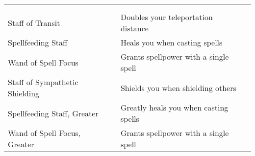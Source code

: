 
\begin{longtabuwrapper}
\begin{longtabu}{l l X l}
 \\
 &  &  &  \\
\bottomrule
Staff of Transit &  & Doubles your teleportation distance & \pageref{item:Staff of Transit} \\
Spellfeeding Staff &  & Heals you when casting spells & \pageref{item:Spellfeeding Staff} \\
Wand of Spell Focus &  & Grants  spellpower with a single spell & \pageref{item:Wand of Spell Focus} \\
Staff of Sympathetic Shielding &  & Shields you when shielding others & \pageref{item:Staff of Sympathetic Shielding} \\
Spellfeeding Staff, Greater &  & Greatly heals you when casting spells & \pageref{item:Spellfeeding Staff, Greater} \\
Wand of Spell Focus, Greater &  & Grants  spellpower with a single spell & \pageref{item:Wand of Spell Focus, Greater} \\
\end{longtabu}
\end{longtabuwrapper}
